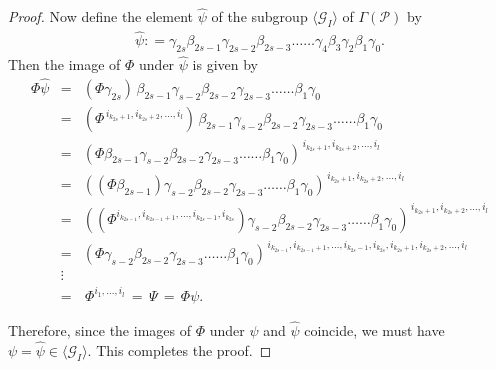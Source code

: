 \documentclass[10pt,a4paper]{amsart}
\begin{document}
\begin{proof}
Now define the element $\widehat{\psi}$ of the subgroup $\langle\mathcal{G}_{I}\rangle$ of $\Gamma(\mathcal{P})$ by
\begin{eqnarray}
\label{star}
\widehat{\psi}: =\gamma_{2s} \beta_{2s-1} \gamma_{2s-2} \beta_{2s-3} \ldots\ldots \gamma_4 \beta_3 \gamma_2 \beta_1 \gamma_{0}.
\end{eqnarray}
Then the image of $\Phi$ under $\widehat{\psi}$ is given by
\[ \begin{array}{lll}
\Phi\widehat{\psi} 
&=& (\Phi\gamma_{2s})\,\beta_{2s-1}\gamma_{s-2}\beta_{2s-2}\gamma_{2s-3}\ldots\ldots\beta_{1}\gamma_{0}\\[.05in]
&=& (\Phi^{\,i_{k_{2s}+1},i_{k_{2s}+2},\ldots,i_l})\,\beta_{2s-1}\gamma_{s-2}\beta_{2s-2}\gamma_{2s-3}\ldots\ldots\beta_{1}\gamma_{0}\\[.05in]
&=& (\Phi\beta_{2s-1}\gamma_{s-2}\beta_{2s-2}\gamma_{2s-3}\ldots\ldots\beta_{1}\gamma_{0})^{\,i_{k_{2s}+1},i_{k_{2s}+2},\ldots,i_l}\\[.05in]
&=& ((\Phi\beta_{2s-1})\gamma_{s-2}\beta_{2s-2}\gamma_{2s-3}\ldots\ldots\beta_{1}\gamma_{0})^{\,i_{k_{2s}+1},i_{k_{2s}+2},\ldots,i_l}\\[.05in]
&=& ((\Phi^{i_{k_{2s-1}}, i_{k_{2s-1}+1}, \dots, i_{k_{2s}-1} , i_{k_{2s}}})\gamma_{s-2}\beta_{2s-2}\gamma_{2s-3}\ldots\ldots\beta_{1}\gamma_{0})^{\,i_{k_{2s}+1},i_{k_{2s}+2},\ldots,i_l}\\[.05in]
&=& (\Phi\gamma_{s-2}\beta_{2s-2}\gamma_{2s-3}\ldots\ldots\beta_{1}\gamma_{0})^{\,{i_{k_{2s-1}}, i_{k_{2s-1}+1}, \ldots, i_{k_{2s}-1},i_{k_{2s}}},i_{k_{2s}+1},i_{k_{2s}+2},\ldots,i_l}\\[.02in]
&\vdots&\\[.02in]
&=&\, \Phi^{i_1,\ldots,i_l} \,=\, \Psi \,=\, \Phi\psi.
\end{array} \]

Therefore, since the images of $\Phi$ under $\psi$ and $\widehat {\psi}$ coincide, we must have $\psi=\widehat{\psi}\in\langle\mathcal{G}_{I}\rangle$. This completes the proof.
\end{proof}
\end{document}
